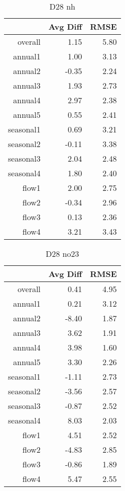 \begin{table}[H]
\centering
\begin{tabular}{rrr}
  \hline
 & Avg Diff & RMSE \\ 
  \hline
overall & 1.15 & 5.80 \\ 
  annual1 & 1.00 & 3.13 \\ 
  annual2 & -0.35 & 2.24 \\ 
  annual3 & 1.93 & 2.73 \\ 
  annual4 & 2.97 & 2.38 \\ 
  annual5 & 0.55 & 2.41 \\ 
  seasonal1 & 0.69 & 3.21 \\ 
  seasonal2 & -0.11 & 3.38 \\ 
  seasonal3 & 2.04 & 2.48 \\ 
  seasonal4 & 1.80 & 2.40 \\ 
  flow1 & 2.00 & 2.75 \\ 
  flow2 & -0.34 & 2.96 \\ 
  flow3 & 0.13 & 2.36 \\ 
  flow4 & 3.21 & 3.43 \\ 
   \hline
\end{tabular}
\caption{D28 nh} 
\end{table}
\begin{table}[H]
\centering
\begin{tabular}{rrr}
  \hline
 & Avg Diff & RMSE \\ 
  \hline
overall & 0.41 & 4.95 \\ 
  annual1 & 0.21 & 3.12 \\ 
  annual2 & -8.40 & 1.87 \\ 
  annual3 & 3.62 & 1.91 \\ 
  annual4 & 3.98 & 1.60 \\ 
  annual5 & 3.30 & 2.26 \\ 
  seasonal1 & -1.11 & 2.73 \\ 
  seasonal2 & -3.56 & 2.57 \\ 
  seasonal3 & -0.87 & 2.52 \\ 
  seasonal4 & 8.03 & 2.03 \\ 
  flow1 & 4.51 & 2.52 \\ 
  flow2 & -4.83 & 2.85 \\ 
  flow3 & -0.86 & 1.89 \\ 
  flow4 & 5.47 & 2.55 \\ 
   \hline
\end{tabular}
\caption{D28 no23} 
\end{table}
